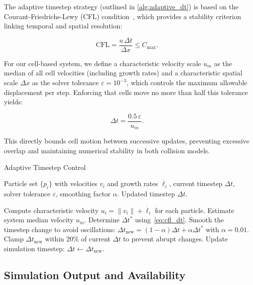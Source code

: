 \documentclass[conference]{IEEEtran}
\begin{document}
The adaptive timestep strategy (outlined in \autoref{alg:adaptive_dt}) is based on the Courant-Friedrichs-Lewy (CFL) condition~\cite{Courant1928}, which provides a stability criterion linking temporal and spatial resolution:

\begin{equation}
    \text{CFL} = \frac{u \, \Delta t}{\Delta x} \leq C_{\text{max}}.
\end{equation}

For our cell-based system, we define a characteristic velocity scale $u_m$ as the median of all cell velocities (including growth rates) and a characteristic spatial scale $\Delta x$ as the solver tolerance $\varepsilon = 10^{-3}$, which controls the maximum allowable displacement per step. Enforcing that cells move no more than half this tolerance yields:

\begin{equation} \label{eq:cfl_dt}
    \Delta t = \frac{0.5 \, \varepsilon}{u_m}.
\end{equation}

This directly bounds cell motion between successive updates, preventing excessive overlap and maintaining numerical stability in both collision models.

\begin{algorithm}[H]
    \caption{Adaptive Timestep Control}
    \label{alg:adaptive_dt}
    \begin{algorithmic}[1]
        \Require Particle set $\{p_i\}$ with velocities $v_i$ and growth rates $\dot{\ell_i}$, current timestep $\Delta t$, solver tolerance $\varepsilon$, smoothing factor $\alpha$.
        \Ensure Updated timestep $\Delta t$.

        \State Compute characteristic velocity $u_i = \|v_i\| + \dot{\ell_i}$ for each particle.
        \State Estimate system median velocity $u_m$.
        \State Determine $\Delta t^*$ using~\autoref{eq:cfl_dt}.
        \State Smooth the timestep change to avoid oscillations: $\Delta t_{\text{new}} = (1 - \alpha)\Delta t + \alpha \Delta t^*$ with $\alpha = 0.01$.
        \State Clamp $\Delta t_{\text{new}}$ within 20\% of current $\Delta t$ to prevent abrupt changes.
        \State Update simulation timestep: $\Delta t \gets \Delta t_{\text{new}}$.
    \end{algorithmic}
\end{algorithm}

\subsection{Simulation Output and Availability}
\end{document}
